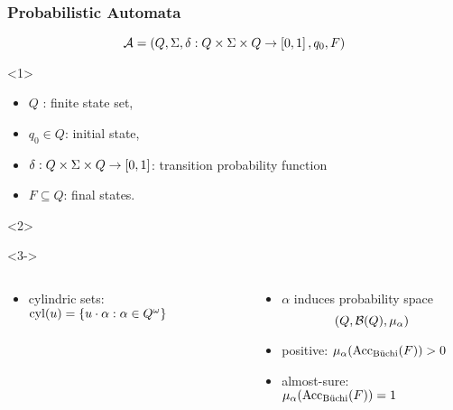 \documentclass{beamer}
\begin{document}
  \begin{frame}
    \frametitle{Probabilistic Automata}
    \begin{equation*}
      \mathcal{A} = \left(Q, \Sigma, 
      \delta:Q\times\Sigma\times Q\rightarrow\left[0,1\right], q_{0}, F\right)
    \end{equation*}
    \begin{overlayarea}{\textwidth}{0.7\textheight}
      \begin{onlyenv}<1>
        \begin{itemize}
          \item $Q$ : finite state set,
          \item $q_{0}\in Q$: initial state,
          \item $\delta:Q\times\Sigma\times Q\rightarrow \left[0,1\right]$: 
            transition probability function
          \item $F\subseteq Q$: final states.
        \end{itemize}
      \end{onlyenv}
      \begin{onlyenv}<2>
        \begin{center}
        \end{center}
      \end{onlyenv}
      \begin{onlyenv}<3->
        \begin{columns}
          \begin{column}{0.5\textwidth}
            \begin{itemize}
              \item<3-> cylindric sets: $\operatorname{cyl}(u) = 
                \left\{u\cdot\alpha:\alpha\in Q^{\omega}\right\}$
            \end{itemize}
            \begin{center}
            \end{center}
          \end{column}
          \begin{column}{0.5\textwidth}
            \begin{itemize}
              \item<4-> $\alpha$ induces probability space 
                \begin{equation*}
                  \left(Q, \mathcal{B}(Q), \mu_{\alpha}\right)
                \end{equation*}
              \item<5-> positive: $\mu_{\alpha}(\operatorname{Acc}_{\operatorname{B\ddot{u}chi}}(F)) > 0$
              \item<6-> almost-sure: $\mu_{\alpha}(\operatorname{Acc}_{\operatorname{B\ddot{u}chi}}(F)) = 1$
            \end{itemize}
          \end{column}
        \end{columns}
      \end{onlyenv}
    \end{overlayarea}
  \end{frame}
\end{document}
